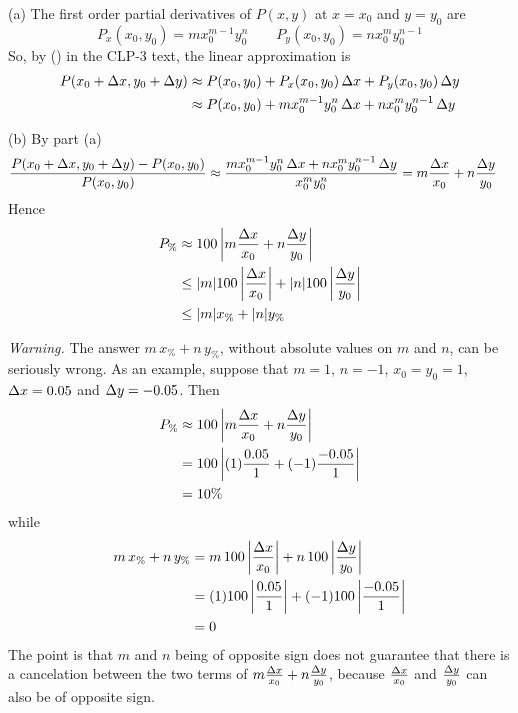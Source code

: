 \begin{solution}
(a) The first order partial derivatives of $P(x,y)$ at $x=x_0$ and $y=y_0$ are
\begin{equation*}
P_x(x_0,y_0) = m x_0^{m-1} y_0^n\qquad
P_y(x_0,y_0) = n x_0^m y_0^{n-1}
\end{equation*}
So, by () in the CLP-3 text, the 
linear approximation is
\begin{align*}
P(x_0+\Delta x,y_0+\Delta y) 
       &\approx P(x_0,y_0) + P_x(x_0,y_0)\,\Delta x  + P_y(x_0,y_0)\,\Delta y\\
       &\approx P(x_0,y_0) + mx_0^{m-1}y_0^n\,\Delta x  + nx_0^m y_0^{n-1}\,\Delta y
\end{align*}

(b) By part (a)
\begin{align*}
\frac{P(x_0+\Delta x,y_0+\Delta y)-P(x_0,y_0)}{P(x_0,y_0)}
&\approx \frac{mx_0^{m-1}y_0^n\,\Delta x  + nx_0^m y_0^{n-1}\,\Delta y}{x_0^my_0^n}
 =m\frac{\Delta x}{x_0} + n\frac{\Delta y}{y_0}
\end{align*}
Hence
\begin{align*}
P_\% &\approx 100\left|m\frac{\Delta x}{x_0} + n\frac{\Delta y}{y_0}\right| \\
     &\le |m| 100\left|\frac{\Delta x}{x_0}\right| 
         + |n| 100\left|\frac{\Delta y}{y_0}\right| \\
     &\le |m| x_\% + |n| y_\%
\end{align*}

\emph{Warning.} The answer $m\,x_\% +n\,y_\%$, without absolute values on $m$
and $n$, can be seriously wrong. As an example, suppose that $m=1$, $n=-1$,
$x_0=y_0=1$, $\Delta x = 0.05$ and $\Delta y=-0.05$. Then
\begin{align*}
P_\%  &\approx 100\left|m\frac{\Delta x}{x_0} + n\frac{\Delta y}{y_0}\right| \\
      &= 100\left|(1)\frac{0.05}{1} + (-1)\frac{-0.05}{1}\right| \\
      & = 10\%
\end{align*}
while
\begin{align*}
m\,x_\% +n\,y_\% &= m\, 100\left|\frac{\Delta x}{x_0}\right| 
         + n\, 100\left|\frac{\Delta y}{y_0}\right| \\
               &=  (1) 100\left|\frac{0.05}{1}\right| 
         + (-1) 100\left|\frac{-0.05}{1}\right| \\
              &= 0
\end{align*}
The point is that $m$ and $n$ being of opposite sign does not guarantee that
there is a cancelation between the two terms of 
$m\frac{\Delta x}{x_0} + n\frac{\Delta y}{y_0}$, because $\frac{\Delta x}{x_0}$ and 
$\frac{\Delta y}{y_0}$ can also be of opposite sign.
\end{solution}


